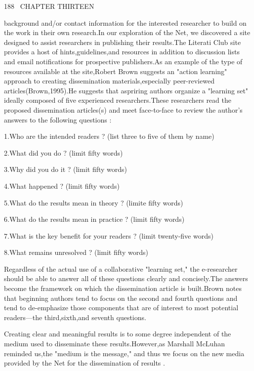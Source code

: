 \documentclass[10pt,a4paper]{article}
\begin{document}
\small

\begin{flushleft}
  188 \, CHAPTER THIRTEEN
\end{flushleft}

background and/or contact information for the interested researcher to build on the work in their own research.In our exploration of the Net, we discovered a site designed to assist researchers in publishing their results.The Literati Club site provides a host of hints,guidelines,and resources in addition to discussion lists and email notifications for prospective publishers.As an example of the type of resources available at the site,Robert Brown suggests an "action learning" approach to creating dissemination materials,especially peer-reviewed articles(Brown,1995).He suggests that aspriring authors organize a "learning set" ideally composed of five experienced researchers.These researchers read the proposed dissemination articles(s) and meet face-to-face to review the author's answers to the following questions :


\begin{flushleft}
  \qquad 1.Who are the intended readers ? (list three to five of them by name)

  \qquad 2.What did you do ? (limit fifty words)

  \qquad 3.Why did you do it ? (limit fifty words)

  \qquad 4.What happened ? (limit fifty words)

  \qquad 5.What do the results mean in theory ? (limite fifty words)

  \qquad 6.What do the results mean in practice ? (limit fifty words)

  \qquad 7.What is the key benefit for your readers ? (limit twenty-five words)

  \qquad 8.What remains unresolved ? (limit fifty words)

\end{flushleft}


Regardless of the actual use of a collaborative "learning set," the e-researcher should be able to answer all of these questions clearly and concisely.The answers become the framework on which the dissemination article is built.Brown notes that beginning authors tend to focus on the second and fourth questions and tend to de-emphasize those components that are of interest to most potential readers---the third,sixth,and seventh questions.

Creating clear and meaningful results is to some degree independent of the medium used to disseminate these results.However,as Marshall McLuhan reminded us,the "medium is the message," and thus we focus on the new media provided by the Net for the dissemination of results .
\end{document}
